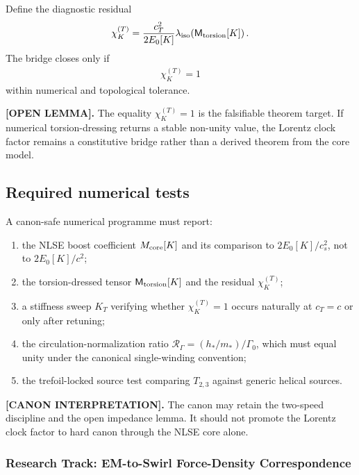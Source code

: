 Define the diagnostic residual
\begin{align}
    \chi_K^{(T)}
    =
    \frac{c_T^2}{2E_0[K]}
    \lambda_{\rm iso}\!\left(\mathsf M_{\rm torsion}[K]\right).
\end{align}
The bridge closes only if
\begin{align}
    \chi_K^{(T)}=1
\end{align}
within numerical and topological tolerance.

\textbf{[OPEN LEMMA].}
The equality \(\chi_K^{(T)}=1\) is the falsifiable theorem target. If numerical torsion-dressing returns a stable non-unity value, the Lorentz clock factor remains a constitutive bridge rather than a derived theorem from the core model.

\subsection{Required numerical tests}

A canon-safe numerical programme must report:
\begin{enumerate}
    \item the NLSE boost coefficient \(M_{\rm core}[K]\) and its comparison to \(2E_0[K]/c_s^2\), not to \(2E_0[K]/c^2\);
    \item the torsion-dressed tensor \(\mathsf M_{\rm torsion}[K]\) and the residual \(\chi_K^{(T)}\);
    \item a stiffness sweep \(K_T\) verifying whether \(\chi_K^{(T)}=1\) occurs naturally at \(c_T=c\) or only after retuning;
    \item the circulation-normalization ratio \(\mathcal R_\Gamma=(h_*/m_*)/\Gamma_0\), which must equal unity under the canonical single-winding convention;
    \item the trefoil-locked source test comparing \(T_{2,3}\) against generic helical sources.
\end{enumerate}

\textbf{[CANON INTERPRETATION].}
The canon may retain the two-speed discipline and the open impedance lemma. It should not promote the Lorentz clock factor to hard canon through the NLSE core alone.



\subsubsection{Research Track: EM-to-Swirl Force-Density Correspondence}
\label{sec:research_em_to_swirl_force_density_correspondence}

